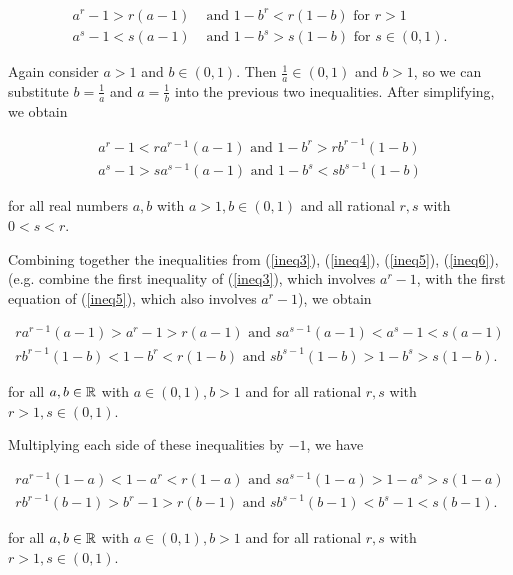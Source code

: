 \documentclass{article}
\begin{document}
\begin{align}
    \label{ineq3}
    a^r - 1 > r(a - 1) &\text{ and } 1 - b^r < r(1 - b) \text{ for $r > 1$} \\
    \label{ineq4}
    a^s - 1 < s(a - 1) &\text{ and } 1 - b^s > s(1 - b) \text{ for $s \in (0, 1)$}.
\end{align}

Again consider $a > 1$ and $b \in (0, 1)$. Then $\frac{1}{a} \in (0, 1)$ and $b > 1$, so we can substitute $b = \frac{1}{a}$ and $a = \frac{1}{b}$ into the previous two inequalities. After simplifying, we obtain

\begin{align}
   \label{ineq5}
   a^r - 1 < r a^{r - 1}(a - 1) \text{ and } 1 - b^r > rb^{r - 1}(1 - b) \\
   \label{ineq6}
   a^s - 1 > sa^{s - 1}(a - 1) \text{ and } 1 - b^s < sb^{s - 1}(1 - b)
\end{align}

for all real numbers $a, b$ with $a > 1, b \in (0, 1)$ and all rational $r, s$ with $0 < s < r$.

Combining together the inequalities from (\ref{ineq3}), (\ref{ineq4}), (\ref{ineq5}), (\ref{ineq6}), (e.g. combine the first inequality of (\ref{ineq3}), which involves $a^r - 1$, with the first equation of (\ref{ineq5}), which also involves $a^r - 1$), we obtain

\begin{align}
    \label{ineq7}
    ra^{r - 1}(a - 1) > a^r - 1 > r(a - 1) \text{ and } sa^{s - 1}(a - 1) < a^s - 1 < s(a - 1) \\
    \label{ineq8}
    rb^{r - 1}(1 - b) < 1 - b^r < r(1 - b) \text{ and } sb^{s - 1}(1 - b) > 1 - b^s > s(1 - b).
\end{align}

for all $a, b \in \mathbb{R}$ with $a \in (0, 1), b > 1$ and for all rational $r, s$ with $r > 1, s \in (0, 1)$.

Multiplying each side of these inequalities by $-1$, we have

\begin{align}
    \label{ineq9}
    ra^{r - 1}(1 - a) < 1 - a^r < r(1 - a) \text{ and } sa^{s - 1}(1 - a) > 1- a^s > s(1 - a) \\
    \label{ineq10}
    rb^{r - 1}(b - 1) > b^r - 1 > r(b - 1) \text{ and } sb^{s - 1}(b - 1) < b^s - 1 < s(b - 1).
\end{align}

for all $a, b \in \mathbb{R}$ with $a \in (0, 1), b > 1$ and for all rational $r, s$ with $r > 1, s \in (0, 1)$.
\end{document}
